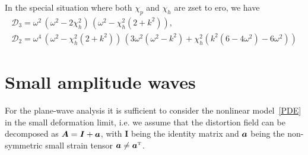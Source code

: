 \documentclass[
10pt, %
a4paper, %
oneside, %
headinclude,footinclude, %
table
]{scrartcl}
\begin{document}
In the special situation where both $\chi_{p}$ and $\chi_{h}$ are zset to ero, we have
$$
\begin{array}{c}
\mathcal{D}_{3}=\omega^2\, \left(\omega^2-2\chi_{h}^2\right)\, \left(\omega^2-\chi_{h}^2(2+k^2)\right), \\[6pt]
\mathcal{D}_{2}=\omega^4 \, \left(\omega^2-\chi_{h}^2(2+k^2)\right) \, \left( 
 3 \omega^2(\omega^2 - k^2)+ \chi_{h}^2( k^2 (6 - 4 \omega^2)-6 \omega^2)  \right)
 \end{array}
$$

\section{Small amplitude waves}

For the plane-wave analysis it is sufficient to consider the nonlinear model~\eqref{PDE} in the 
small deformation limit, i.e. we assume that the distortion field can be decomposed as $ \bm{A} = 
\bm{I} + \bm{a} $, with $ \bm{I} $ being the identity matrix and $ \bm{a} $ being the 
non-symmetric small strain tensor $ \Distsmall \neq \Distsmall^\transpose $.



\printbibliography
\end{document}

